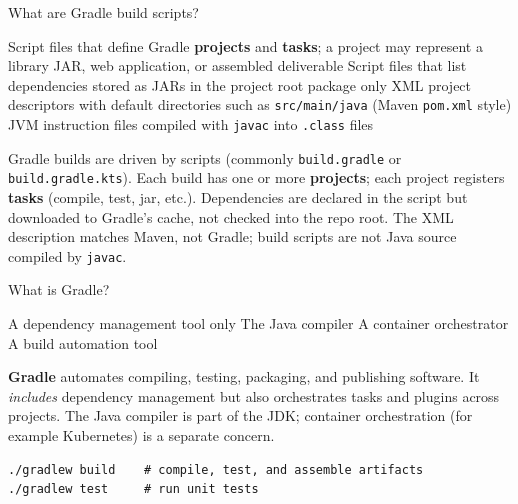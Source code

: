 \question[4]
What are Gradle build scripts?
\begin{choices}
  \CorrectChoice Script files that define Gradle \textbf{projects} and \textbf{tasks}; a project may represent a library JAR, web application, or assembled deliverable
  \choice Script files that list dependencies stored as JARs in the project root package only
  \choice XML project descriptors with default directories such as \texttt{src/main/java} (Maven \texttt{pom.xml} style)
  \choice JVM instruction files compiled with \lstinline[style=javainline]|javac| into \texttt{.class} files
\end{choices}
\begin{solution}
  Gradle builds are driven by scripts (commonly \lstinline[style=bashinline]|build.gradle| or \lstinline[style=bashinline]|build.gradle.kts|). Each build has one or more \textbf{projects}; each project registers \textbf{tasks} (compile, test, jar, etc.). Dependencies are declared in the script but downloaded to Gradle's cache, not checked into the repo root. The XML description matches Maven, not Gradle; build scripts are not Java source compiled by \lstinline[style=javainline]|javac|.
\end{solution}



\newpage




\question[4]
What is Gradle?
\begin{choices}
  \choice A dependency management tool only
  \choice The Java compiler
  \choice A container orchestrator
  \CorrectChoice A build automation tool
\end{choices}
\begin{solution}
  \textbf{Gradle} automates compiling, testing, packaging, and publishing software. It \emph{includes} dependency management but also orchestrates tasks and plugins across projects. The Java compiler is part of the JDK; container orchestration (for example Kubernetes) is a separate concern.
\begin{lstlisting}[style=bash]
./gradlew build    # compile, test, and assemble artifacts
./gradlew test     # run unit tests
\end{lstlisting}
\end{solution}

